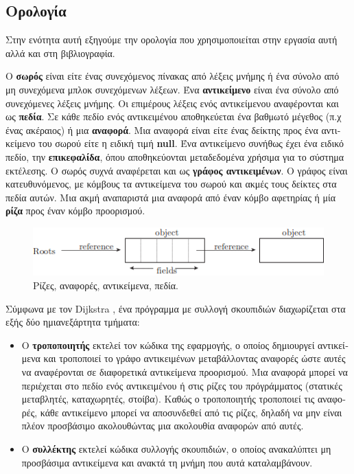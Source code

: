 \begin{greek}
\section{Ορολογία}
Στην ενότητα αυτή εξηγούμε την ορολογία που χρησιμοποιείται
στην εργασία αυτή αλλά και στη βιβλιογραφία.

Ο \textbf{σωρός} είναι είτε ένας συνεχόμενος πίνακας από λέξεις
μνήμης ή ένα σύνολο από μη συνεχόμενα μπλοκ συνεχόμενων λέξεων.
Ένα \textbf{αντικείμενο} είναι ένα σύνολο από συνεχόμενες λέξεις
μνήμης. Οι επιμέρους λέξεις ενός αντικείμενου αναφέρονται και ως
\textbf{πεδία}. Σε κάθε πεδίο ενός αντικειμένου αποθηκεύεται ένα
βαθμωτό μέγεθος (π.χ ένας ακέραιος) ή μια \textbf{αναφορά}. Μια
αναφορά είναι είτε ένας δείκτης προς ένα αντικείμενο του σωρού
είτε η ειδική τιμή \textbf{null}. Ένα αντικείμενο συνήθως έχει
ένα ειδικό πεδίο, την \textbf{επικεφαλίδα}, όπου αποθηκεύονται
μεταδεδομένα χρήσιμα για το σύστημα εκτέλεσης. Ο σωρός συχνά
αναφέρεται και ως \textbf{γράφος αντικειμένων}. Ο γράφος είναι
κατευθυνόμενος, με κόμβους τα αντικείμενα του σωρού και ακμές
τους δείκτες στα πεδία αυτών. Μια ακμή αναπαριστά μια αναφορά από
έναν κόμβο αφετηρίας ή μία \textbf{ρίζα} προς έναν κόμβο προορισμού.

\begin{figure}[H]
 \centering
 \includegraphics{figures/intro_3}
 \caption{Ρίζες, αναφορές, αντικείμενα, πεδία.}
 \label{fig:intro_3}
\end{figure}
 
Σύμφωνα με τον Dijkstra \cite{DBLP:conf/ac/DijkstraLMSS75,
DBLP:journals/cacm/DijkstraLMSS78}, ένα πρόγραμμα με συλλογή
σκουπιδιών διαχωρίζεται στα εξής δύο ημιανεξάρτητα τμήματα:

\begin{itemize}
\item Ο \textbf{τροποποιητής} εκτελεί τον κώδικα της εφαρμογής,
      ο οποίος δημιουργεί αντικείμενα και τροποποιεί το γράφο
      αντικειμένων μεταβάλλοντας αναφορές ώστε αυτές να αναφέρονται
      σε διαφορετικά αντικείμενα προορισμού. Μια αναφορά μπορεί
      να περιέχεται στο πεδίο ενός αντικειμένου ή στις ρίζες
      του πρόγράμματος (στατικές μεταβλητές, καταχωρητές, στοίβα).
      Καθώς ο τροποποιητής τροποποιεί τις αναφορές, κάθε αντικείμενο
      μπορεί να αποσυνδεθεί από τις ρίζες, δηλαδή να μην είναι
      πλέον προσβάσιμο ακολουθώντας μια ακολουθία αναφορών από
      αυτές.
\item Ο \textbf{συλλέκτης} εκτελεί κώδικα συλλογής σκουπιδιών,
      ο οποίος ανακαλύπτει μη προσβάσιμα αντικείμενα και ανακτά
      τη μνήμη που αυτά καταλαμβάνουν.
\end{itemize}


\end{greek}
